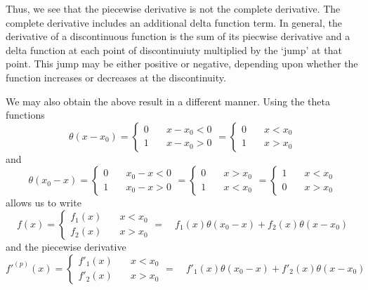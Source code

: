 Thus, we see that the piecewise derivative is not the complete derivative.  The
complete derivative includes an additional delta function term.  In general,
the derivative of a discontinuous function is the sum of its piecwise
derivative and a delta function at each point of discontinuiuty multiplied by
the `jump' at that point.  This jump may be either positive or negative,
depending upon whether the function increases or decreases at the
discontinuity.

We may also obtain the above result in a different manner.  Using the theta
functions
\begin{equation*}
  \theta(x - x_0)
  = \left\{
    \begin{array}{lr}
      0 &\quad x-x_0 < 0 \\
      1 &\quad x-x_0 > 0
    \end{array}\right.
  = \left\{
    \begin{array}{lr}
      0 &\quad x < x_0 \\
      1 &\quad x > x_0
    \end{array}\right.
\end{equation*}
and
\begin{equation*}
  \theta(x_0 - x)
  = \left\{
    \begin{array}{lr}
      0 &\quad x_0 - x < 0 \\
      1 &\quad x_0 - x > 0
    \end{array}\right.
  = \left\{
    \begin{array}{lr}
      0 &\quad x > x_0 \\
      1 &\quad x < x_0
    \end{array}\right.
  = \left\{
    \begin{array}{lr}
      1 &\quad x < x_0 \\
      0 &\quad x > x_0
    \end{array}\right.
\end{equation*}
allows us to write
\begin{equation*}
  f(x)
  = \left\{
    \begin{array}{lr}
      f_1(x) &\quad x < x_0 \\
      f_2(x) &\quad x > x_0
    \end{array}\right.
  = \quad f_1(x)\theta(x_0 - x) + f_2(x)\theta(x - x_0)
\end{equation*}
and the piecewise derivative
\begin{equation*}
  f'^{(p)}(x)
  = \left\{
    \begin{array}{lr}
      f'_1(x) &\quad x < x_0 \\
      f'_2(x) &\quad x > x_0
    \end{array}\right.
  = \quad f'_1(x)\theta(x_0 - x) + f'_2(x)\theta(x - x_0)
\end{equation*}
